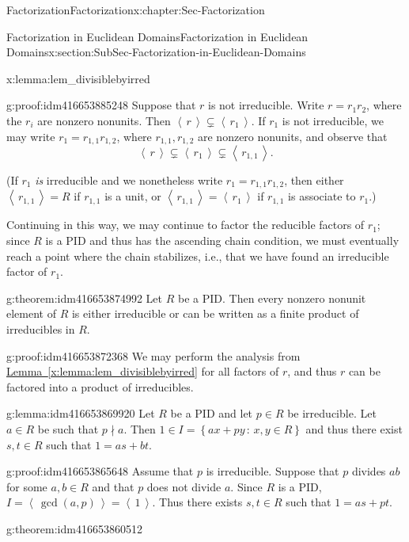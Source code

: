 \documentclass[oneside,10pt,]{book}
\numberwithin{equation}{section}
\newcommand{\ideal}[1]{\left\langle\, #1 \,\right\rangle}
\newcommand{\setof}[2]{{\left\{#1\,\colon\,#2\right\}}}
\begin{document}
\begin{chapterptx}{Factorization}{}{Factorization}{}{}{x:chapter:Sec-Factorization}
\begin{sectionptx}{Factorization in Euclidean Domains}{}{Factorization in Euclidean Domains}{}{}{x:section:SubSec-Factorization-in-Euclidean-Domains}
\begin{lemma}{}{}{x:lemma:lem_divisiblebyirred}
\end{lemma}
\begin{proofptx}{}{g:proof:idm416653885248}
Suppose that \(r\) is not irreducible. Write \(r = r_1 r_2\), where the \(r_i\) are nonzero nonunits. Then \(\ideal{r} \subsetneq \ideal{r_1}\). If \(r_1\) is not irreducible, we may write \(r_1 = r_{1,1}r_{1,2}\), where \(r_{1,1},r_{1,2}\) are nonzero nonunits, and observe that%
\begin{equation*}
\ideal{r} \subsetneq \ideal{r_1}\subsetneq \ideal{r_{1,1}}\text{.}
\end{equation*}
%
\par
(If \(r_1\) \emph{is} irreducible and we nonetheless write \(r_1 = r_{1,1} r_{1,2}\), then either \(\ideal{r_{1,1}} = R\) if \(r_{1,1}\) is a unit, or \(\ideal{r_{1,1}} = \ideal{r_1}\) if \(r_{1,1}\) is associate to \(r_1\).)%
\par
Continuing in this way, we may continue to factor the reducible factors of \(r_1\); since \(R\) is a PID and thus has the ascending chain condition, we must eventually reach a point where the chain stabilizes, i.e., that we have found an irreducible factor of \(r_1\).%
\end{proofptx}
\begin{theorem}{}{}{g:theorem:idm416653874992}%
Let \(R\) be a PID. Then every nonzero nonunit element of \(R\) is either irreducible or can be written as a finite product of irreducibles in \(R\).%
\end{theorem}
\begin{proofptx}{}{g:proof:idm416653872368}
We may perform the analysis from \hyperref[x:lemma:lem_divisiblebyirred]{Lemma~\ref{x:lemma:lem_divisiblebyirred}} for all factors of \(r\), and thus \(r\) can be factored into a product of irreducibles.%
\end{proofptx}
\begin{lemma}{}{}{g:lemma:idm416653869920}%
Let \(R\) be a PID and let \(p\in R\) be irreducible. Let \(a\in R\) be such that \(p\nmid a\). Then \(1\in I = \setof{ax+py}{x,y\in R}\) and thus there exist \(s,t\in R\) such that \(1 = as+bt\).%
\end{lemma}
\begin{proofptx}{}{g:proof:idm416653865648}
Assume that \(p\) is irreducible. Suppose that \(p\) divides \(ab\) for some \(a,b \in R\) and that \(p\) does not divide \(a\). Since \(R\) is a PID, \(I = \ideal{\gcd(a,p)} = \ideal{1}\). Thus there exists \(s,t\in R\) such that \(1=as+pt\).%
\end{proofptx}
\begin{theorem}{}{}{g:theorem:idm416653860512}%

\end{theorem}
\end{sectionptx}
\end{chapterptx}
\end{document}
